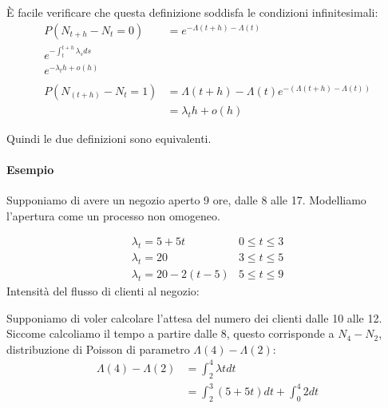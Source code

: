 \documentclass[a4paper,12pt]{book}
\begin{document}
È facile verificare che questa definizione soddisfa le condizioni infinitesimali:
\begin{align*}
	P(N_{t+h} - N_t = 0) & = e^{-\Lambda(t+h) - \Lambda(t)} \\ 
	e^{-\int_{t}^{t+h} \lambda_s ds} \\
	e^{-\lambda_t h + o(h)} \\
	\\
	P(N_{(t+h)} - N_t = 1 ) & = \Lambda(t+h) - \Lambda(t) e^{-(\Lambda(t+h) - \Lambda(t))} \\
	& = \lambda_t h + o(h)
\end{align*}

Quindi le due definizioni sono equivalenti. 

\paragraph{Esempio} Supponiamo di avere un negozio aperto 9 ore, dalle 8 alle 17. Modelliamo l'apertura come un processo non omogeneo.

$$ \begin{array}{cc}
	\lambda_t = 5 + 5t & 0 \le t \le 3 \\
	\lambda_t = 20 & 3 \le t \le 5 \\
	\lambda_t = 20 - 2(t-5) & 5 \le t \le 9
\end{array}
$$
Intensità del flusso di clienti al negozio:
\begin{center}
\end{center}

Supponiamo di voler calcolare l'attesa del numero dei clienti dalle 10 alle 12. Siccome calcoliamo il tempo a partire dalle 8, questo corrisponde a $ N_4 - N_2 $, distribuzione di Poisson di parametro $\Lambda(4) - \Lambda(2)$:
\begin{align*}
	\Lambda(4) - \Lambda(2) & = \int_2^4 \lambda t dt \\
	& = \int_{2}^{3} (5 + 5t) dt + \int_{0}^{4} 2 dt
\end{align*}
\end{document}
